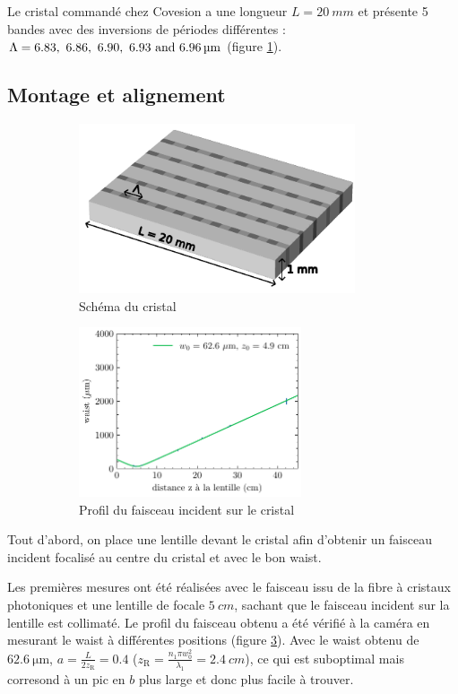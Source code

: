 \documentclass[11pt,a4paper] { article}
\newcommand{\zr}{z_\mathsc{R}}
\newcommand{\mathsc}[1]{\mathrm{\scriptscriptstyle {#1}}}
\begin{document}
Le cristal commandé chez Covesion a une longueur $L=\SI{20}{mm}$ et présente 5 bandes avec des inversions de périodes différentes : $\Lambda = \qtylist[list-units = single]{6.83; 6.86 ; 6.90 ; 6.93 ; 6,96}{\micro\meter}$ (figure \ref{fig:sc}).

\subsection{Montage et alignement}

\begin{figure}[htpb]
\centering
\hspace*{-0.4cm}
\begin{subfigure}[h]{0.48\textwidth}
	\centering
	\includegraphics[height=5cm]{./img/cristal.pdf}
	\caption{Schéma du cristal}
	\label{fig:sc}
\end{subfigure}
\centering
\hspace*{-0.4cm}
\begin{subfigure}[h]{0.48\textwidth}
    \includegraphics[height=5cm]{../donnees/waist faisceau incident.pdf}
    \caption{Profil du faisceau incident sur le cristal}
    \label{fig:wincident}
\end{subfigure}
\caption{}
\end{figure}

Tout d'abord, on place une lentille devant le cristal afin d'obtenir un faisceau incident focalisé au centre du cristal et avec le bon waist.

Les premières mesures ont été réalisées avec le faisceau issu de la fibre à cristaux photoniques et une lentille de focale $\SI{5}{cm}$, sachant que le faisceau incident sur la lentille est collimaté. Le profil du faisceau obtenu a été vérifié à la caméra en mesurant le waist à différentes positions (figure \ref{fig:wincident}). Avec le waist obtenu de $\SI{62.6}{\micro\meter}$, $a=\frac{L}{2\zr}=0.4$ ($\zr = \frac{n_1 \pi w_0^2}{\lambda_1} = \SI{2.4}{cm}$), 
 ce qui est suboptimal mais corresond à un pic en $b$ plus large et donc plus facile à trouver.
\end{document}
